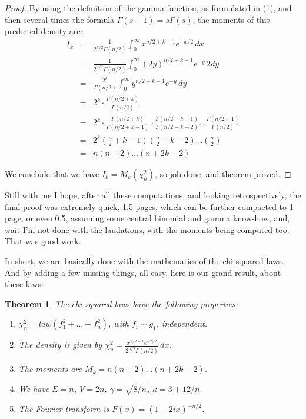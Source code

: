 \documentclass[12pt]{amsbook}
\newtheorem{theorem}{Theorem}[chapter]
\begin{document}
\begin{proof}
By using the definition of the gamma function, as formulated in (1), and then several times the formula $\Gamma(s+1)=s\Gamma(s)$, the moments of this predicted density are:
\begin{eqnarray*}
I_k
&=&\frac{1}{2^{n/2}\Gamma(n/2)}\int_0^\infty x^{n/2+k-1}e^{-x/2}\,dx\\
&=&\frac{1}{2^{n/2}\Gamma(n/2)}\int_0^\infty (2y)^{n/2+k-1}e^{-y}\,2dy\\
&=&\frac{2^k}{\Gamma(n/2)}\int_0^\infty y^{n/2+k-1}e^{-y}\,dy\\
&=&2^k\cdot\frac{\Gamma(n/2+k)}{\Gamma(n/2)}\\
&=&2^k\cdot\frac{\Gamma(n/2+k)}{\Gamma(n/2+k-1)}\cdot\frac{\Gamma(n/2+k-1)}{\Gamma(n/2+k-2)}\ldots\frac{\Gamma(n/2+1)}{\Gamma(n/2)}\\
&=&2^k\left(\frac{n}{2}+k-1\right)\left(\frac{n}{2}+k-2\right)\ldots\left(\frac{n}{2}\right)\\
&=&n(n+2)\ldots(n+2k-2)
\end{eqnarray*}

We conclude that we have $I_k=M_k(\chi_n^2)$, so job done, and theorem proved.
\end{proof}

Still with me I hope, after all these computations, and looking retrospectively, the final proof was  extremely quick, 1.5 pages, which can be further compacted to 1 page, or even 0.5, assuming some central binomial and gamma know-how, and, wait I'm not done with the laudations, with the moments being computed too. That was good work.

\bigskip

In short, we are basically done with the mathematics of the chi squared laws. And by adding a few missing things, all easy, here is our grand result, about these laws:

\begin{theorem}
The chi squared laws have the following properties: 
\begin{enumerate}
\item $\chi_n^2=law(f_1^2+\ldots+f_n^2)$, with $f_i\sim g_1$, independent.

\item The density is given by $\chi_n^2=\frac{x^{n/2-1}e^{-x/2}}{2^{n/2}\Gamma(n/2)}\,dx$.

\item The moments are $M_k=n(n+2)\ldots(n+2k-2)$.

\item We have $E=n$, $V=2n$, $\gamma=\sqrt{8/n}$, $\kappa=3+12/n$.

\item The Fourier transform is $F(x)=(1-2ix)^{-n/2}$.
\end{enumerate}
\end{theorem}
\end{document}
